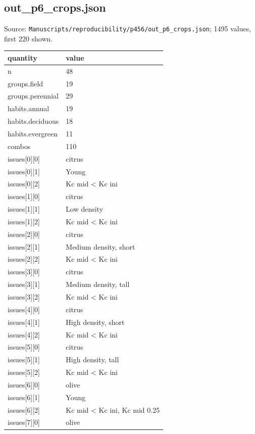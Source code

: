 \subsection*{out\_p6\_crops.json}
\noindent\small Source: \nolinkurl{Manuscripts/reproducibility/p456/out_p6_crops.json}; 1495 values, first 220 shown.\par
{\scriptsize\begin{longtable}{p{}p{}}\toprule\textbf{quantity} & \textbf{value}\\\midrule\endhead
{}n & 48\\
{}groups.field & 19\\
{}groups.perennial & 29\\
{}habits.annual & 19\\
{}habits.deciduous & 18\\
{}habits.evergreen & 11\\
{}combos & 110\\
{}issues[0][0] & citrus\\
{}issues[0][1] & Young\\
{}issues[0][2] & Kc mid < Kc ini\\
{}issues[1][0] & citrus\\
{}issues[1][1] & Low density\\
{}issues[1][2] & Kc mid < Kc ini\\
{}issues[2][0] & citrus\\
{}issues[2][1] & Medium density, short\\
{}issues[2][2] & Kc mid < Kc ini\\
{}issues[3][0] & citrus\\
{}issues[3][1] & Medium density, tall\\
{}issues[3][2] & Kc mid < Kc ini\\
{}issues[4][0] & citrus\\
{}issues[4][1] & High density, short\\
{}issues[4][2] & Kc mid < Kc ini\\
{}issues[5][0] & citrus\\
{}issues[5][1] & High density, tall\\
{}issues[5][2] & Kc mid < Kc ini\\
{}issues[6][0] & olive\\
{}issues[6][1] & Young\\
{}issues[6][2] & Kc mid < Kc ini, Kc mid 0.25\\
{}issues[7][0] & olive\\

\end{longtable}}
